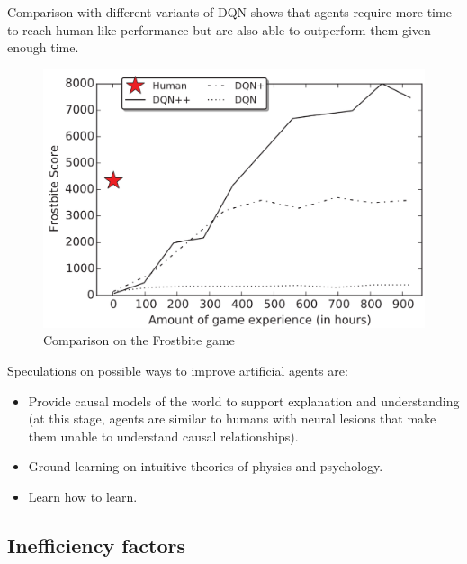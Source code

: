 \begin{description}
\begin{casestudy}
            Comparison with different variants of DQN shows that agents require more time to reach human-like performance but are also able to outperform them given enough time.
            \begin{figure}[H]
                \centering
                \includegraphics[width=0.4\linewidth]{./img/atari_dqn1.png}
                \caption{Comparison on the Frostbite game}
            \end{figure}
        \end{casestudy}

        \begin{remark}
            Speculations on possible ways to improve artificial agents are:
            \begin{itemize}
                \item Provide causal models of the world to support explanation and understanding (at this stage, agents are similar to humans with neural lesions that make them unable to understand causal relationships).
                \item Ground learning on intuitive theories of physics and psychology.
                \item Learn how to learn.
            \end{itemize}
        \end{remark}
\end{description}


\subsection{Inefficiency factors}

